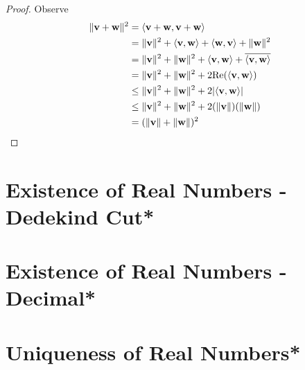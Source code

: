 \documentclass{report}
\begin{document}
\begin{proof}
Observe
\begin{align}
\| \textbf{v}+\textbf{w} \|^2&=\langle \textbf{v}+\textbf{w},\textbf{v}+\textbf{w} \rangle\\
&=\| \textbf{v} \|^2+\langle \textbf{v},\textbf{w} \rangle+\langle \textbf{w},\textbf{v} \rangle+\| \textbf{w} \|^2\\
&=\| \textbf{v} \|^2+\| \textbf{w} \|^2+\langle \textbf{v},\textbf{w} \rangle+\overline{\langle \textbf{v},\textbf{w} \rangle}\\
&=\| \textbf{v} \|^2+\| \textbf{w} \|^2+2\text{Re}(\langle \textbf{v},\textbf{w} \rangle)\\
&\leq \| \textbf{v} \|^2+\| \textbf{w} \|^2+2|\langle \textbf{v},\textbf{w} \rangle|\\
&\leq \| \textbf{v} \|^2+\| \textbf{w} \|^2+2(\| \textbf{v} \|)(\| \textbf{w} \|)\\
&=(\| \textbf{v} \|+\| \textbf{w} \|)^2
\end{align}
\end{proof}
\section{Existence of Real Numbers - Dedekind Cut*}
\section{Existence of Real Numbers - Decimal*}
\section{Uniqueness of Real Numbers*}
\end{document}
